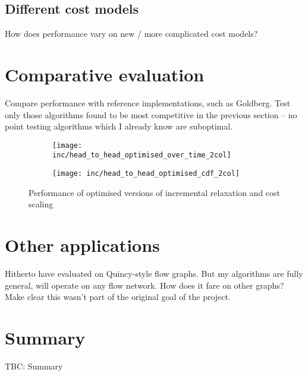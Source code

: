 \subsection{Different cost models}

How does performance vary on new / more complicated cost models?

\section{Comparative evaluation} \label{sec:eval-comparative}

Compare performance with reference implementations, such as Goldberg. Test only those algorithms found to be most competitive in the previous section -- no point testing algorithms which I already know are suboptimal.

\begin{figure}
    \begin{widepage}
    \begin{subfigure}[c]{0.5\textwidth}
        \texttt{[image: inc/head\_to\_head\_optimised\_over\_time\_2col]}
    \end{subfigure}
    \begin{subfigure}[c]{0.5\textwidth}
        \texttt{[image: inc/head\_to\_head\_optimised\_cdf\_2col]}
    \end{subfigure}
    \end{widepage}
    \caption{Performance of optimised versions of incremental relaxation and cost scaling}
    \label{fig:inc-head-to-head-optimised}
\end{figure}

\section{Other applications}

Hitherto have evaluated on Quincy-style flow graphs. But my algorithms are fully general, will operate on any flow network. How does it fare on other graphs? Make clear this wasn't part of the original goal of the project.

\section{Summary}

TBC: Summary